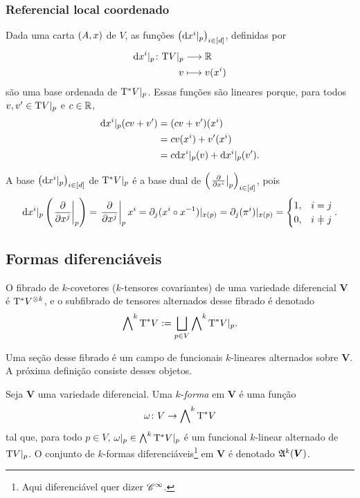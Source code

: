 \subsubsection{Referencial local coordenado}

Dada uma carta $(A,x)$ de $V$, as funções $\left( \mathrm{d} x^i|_p \right)_{i \in [d]}$, definidas por
	\begin{align*}
	{\mathrm{d}x^i|_p}\colon {\mathrm{T}V|_p} &\longrightarrow {\mathbb{R}} \\{v} &\longmapsto v(x^i)
	\end{align*}
são uma base ordenada de $\mathrm{T}^* V|_p$. Essas funções são lineares porque, para todos $v,v' \in \mathrm{T} V|_p$ e $c \in \mathbb{R}$,
	\begin{align*}
	\mathrm{d} x^i|_p(cv+v') &= (cv+v')(x^i) \\
		&= cv(x^i) + v'(x^i) \\
		&= c\mathrm{d} x^i|_p(v) + \mathrm{d} x^i|_p(v').
	\end{align*}

A base $\left( \mathrm{d} x^i|_p \right)_{i \in [d]}$ de $\mathrm{T}^* V|_p$ é a base dual de $\left( \left.{\frac{\partial{}}{\partial{x^i}}}\right|_{p} \right)_{i \in [d]}$, pois
	\begin{equation*}
	\dd x^i|_p\left(\derr{\x^j}_{p}\right) = \derr{\x^j}_{p}\x^i = \partial_j(\x^i \circ \x\inv)|_{\x(p)} = \partial_j(\pi^i)|_{\x(p)} =
		\begin{cases}
			1,& i=j \\
			0,& i \neq j
		\end{cases}.
	\end{equation*}





\subsection{Formas diferenciáveis}

O fibrado de $k$-covetores ($k$-tensores covariantes) de uma variedade diferencial $\bm V$ é $\mathrm{T}^{\ast} V^{\otimes k}$, e o subfibrado de tensores alternados desse fibrado é denotado
	\begin{equation*}
	\bigwedge\nolimits^k \mathrm{T}^* V := \bigsqcup_{p \in V} \bigwedge\nolimits^k \mathrm{T}^* V|_p.
	\end{equation*}

Uma seção desse fibrado é um campo de funcionais $k$-lineares alternados sobre $\bm V$. A próxima definição consiste desses objetos.

\begin{definition}
Seja $\bm V$ uma variedade diferencial. Uma $k$-\emph{forma} em $\bm V$ é uma função
	\begin{equation*}
	\omega\colon V \to \bigwedge\nolimits^k \mathrm{T}^{\ast} V
	\end{equation*}
tal que, para todo $p \in V$, $\omega|_p \in \bigwedge^k\mathrm{T}^{\ast} V|_p$ é um funcional $k$-linear alternado de $\mathrm{T} V|_p$. O conjunto de $k$-formas diferenciáveis\footnote{Aqui diferenciável quer dizer $\mathscr{C}^\infty$.} em $\bm V$ é denotado $\mathfrak{A}^k (\bm V)$.
\end{definition}

